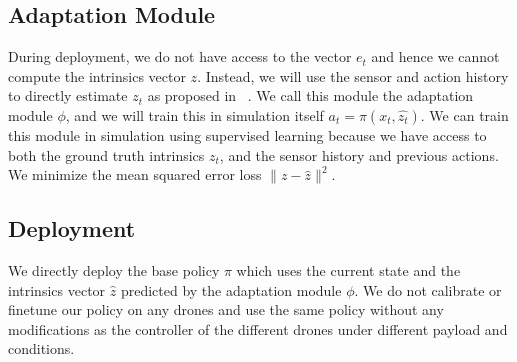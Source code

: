 \subsection{Adaptation Module}
During deployment, we do not have access to the vector $e_t$ and hence we cannot compute the intrinsics vector $z$. Instead, we will use the sensor and action history to directly estimate $z_t$ as proposed in ~\cite{kumar2021rma}. We call this module the adaptation module $\phi$, and we will train this in simulation itself $a_t = \pi(x_t, \hat{z_t})$. We can train this module in simulation using supervised learning because we have access to both the ground truth intrinsics $z_t$, and the sensor history and previous actions. We minimize the mean squared error loss $\lVert z - \hat{z} \rVert ^2$.  

\subsection{Deployment}
We directly deploy the base policy $\pi$ which uses the current state and the intrinsics vector $\hat{z}$ predicted by the adaptation module $\phi$. We do not calibrate or finetune our policy on any drones and use the same policy without any modifications as the controller of the different drones under different payload and conditions.
